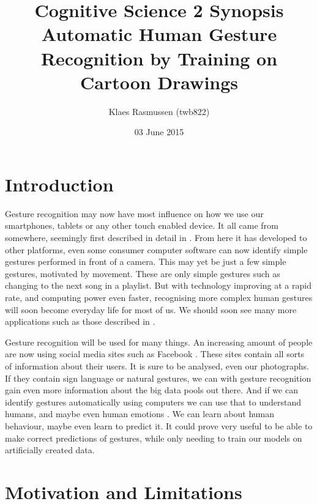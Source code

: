 \documentclass[11pt,a4paper]{article}
\begin{document}
\title{Cognitive Science 2 Synopsis \\ Automatic Human Gesture Recognition by Training on Cartoon Drawings}
\author{Klaes Rasmussen (twb822)}
\date{03 June 2015}
\maketitle
\pagebreak

\tableofcontents

\pagebreak

\section{Introduction}
\label{sec:introduction}

Gesture recognition may now have most influence on how we use our smartphones, tablets or any other touch enabled device. It all came from somewhere, seemingly first described in detail in \cite{Rubine}. From here it has developed to other platforms, even some consumer computer software can now identify simple gestures performed in front of a camera. This may yet be just a few simple gestures, motivated by movement. These are only simple gestures such as changing to the next song in a playlist. But with technology improving at a rapid rate, and computing power even faster, recognising more complex human gestures will soon become everyday life for most of us. We should soon see many more applications such as those described in \cite{Wachs}.

\vspace{0.5pc}

Gesture recognition will be used for many things. An increasing amount of people are now using social media sites such as Facebook \linebreak \cite{pew}. These sites contain all sorts of information about their users. It is sure to be analysed, even our photographs. If they contain sign language or natural gestures, we can with gesture recognition gain even more information about the big data pools out there. And if we can identify gestures automatically using computers we can use that to understand humans, and maybe even human emotions \cite{kipp}. We can learn about human behaviour, maybe even learn to predict it. It could prove very useful to be able to make correct predictions of gestures, while only needing to train our models on artificially created data.

\section{Motivation and Limitations}
\label{sec:motivation}
\end{document}
